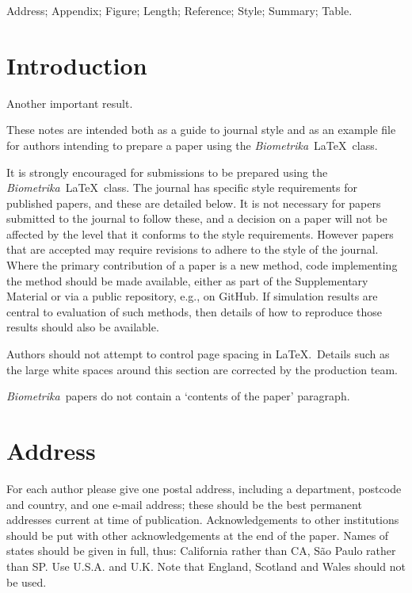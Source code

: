 \documentclass[lineno]{biometrika}
\def\Bka{{\it Biometrika}}
\begin{document}
\begin{keywords}
Address; Appendix; Figure; Length; Reference; Style; Summary; Table.
\end{keywords}

\section{Introduction}
\begin{theorem}
Another important result.
\end{theorem}
These notes are intended both as a guide to journal style and as an example file for authors intending to prepare a paper using  the \Bka\ \LaTeX\ class.

It is strongly encouraged for submissions to be prepared using the \Bka\ \LaTeX\ class. The journal has specific style requirements for published papers, and these are detailed below. It is not necessary for papers submitted to the journal to follow these, and a decision on a paper will not be affected by the level that it conforms to the style requirements. However papers that are accepted may require revisions to adhere to the style of the journal. Where the primary contribution of a paper is a new method, code implementing the method should be made available, either as part of the Supplementary Material or via a public repository, e.g., on GitHub. If simulation results are central to evaluation of such methods, then details of how to reproduce those results should also be available. 

Authors should not attempt to control page spacing in \LaTeX.\  Details such as the large white spaces around this section are corrected by the production team.

\Bka\  papers do not contain a `contents of the paper' paragraph.

\section{Address}

For each author please give one postal address, including a department, postcode and country, and one e-mail address; these should be the best permanent addresses current at time of publication. Acknowledgements to other institutions should be put with other acknowledgements at the end of the paper. Names of states should be given in full, thus: California rather than CA, S\~ao Paulo rather than SP. Use U.S.A. and U.K. Note that England, Scotland and Wales should not be used.
\end{document}
